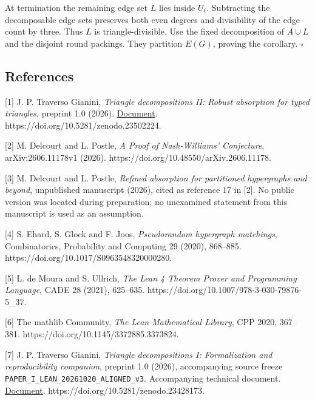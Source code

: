 \documentclass[english,11pt,a4paper]{article}
\begin{document}
At termination the remaining edge set \(L\) lies inside \(U_\ell\). Subtracting the decomposable edge sets preserves both even degrees and divisibility of the edge count by three. Thus \(L\) is triangle-divisible. Use the fixed decomposition of \(A\cup L\) and the disjoint round packings. They partition \(E(G)\), proving the corollary. \(\square\)

\subsection{References}\label{references}

\begingroup\small\raggedright
\setlength{\parskip}{3pt}

{[}1{]} J. P. Traverso Gianini, \emph{Triangle decompositions II: Robust absorption for typed triangles}, preprint 1.0 (2026). \href{https://github.com/jtraverso/nash-williams-triangle-decompositions-release/blob/main/preprints/PAPER_II/01_manuscript/PAPER_II_preprint_v1.0_en.md}{Document}. https://doi.org/10.5281/zenodo.23502224.

{[}2{]} M. Delcourt and L. Postle, \emph{A Proof of Nash-Williams' Conjecture}, arXiv:2606.11178v1 (2026). https://doi.org/10.48550/arXiv.2606.11178.

{[}3{]} M. Delcourt and L. Postle, \emph{Refined absorption for partitioned hypergraphs and beyond}, unpublished manuscript (2026), cited as reference 17 in {[}2{]}. No public version was located during preparation; no unexamined statement from this manuscript is used as an assumption.

{[}4{]} S. Ehard, S. Glock and F. Joos, \emph{Pseudorandom hypergraph matchings}, Combinatorics, Probability and Computing 29 (2020), 868--885. https://doi.org/10.1017/S0963548320000280.

{[}5{]} L. de Moura and S. Ullrich, \emph{The Lean 4 Theorem Prover and Programming Language}, CADE 28 (2021), 625--635. https://doi.org/10.1007/978-3-030-79876-5\_37.

{[}6{]} The mathlib Community, \emph{The Lean Mathematical Library}, CPP 2020, 367--381. https://doi.org/10.1145/3372885.3373824.

{[}7{]} J. P. Traverso Gianini, \emph{Triangle decompositions I: Formalization and reproducibility companion}, preprint 1.0 (2026), accompanying source freeze \texttt{PAPER\_\allowbreak{}I\_\allowbreak{}LEAN\_\allowbreak{}20261020\_\allowbreak{}ALIGNED\_\allowbreak{}v3}. Accompanying technical document. \href{https://github.com/jtraverso/nash-williams-triangle-decompositions-release/blob/main/preprints/PAPER_I/05_formalization/FORMALIZATION_COMPANION_preprint_v1.0_en.md}{Document}. https://doi.org/10.5281/zenodo.23428173.
\end{document}
